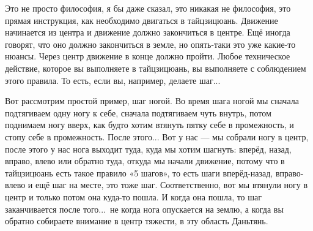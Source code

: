Это не просто философия, я бы даже сказал, это никакая не философия, это прямая инструкция, как
необходимо двигаться в тайцзицюань. Движение начинается из центра и движение должно закончиться
в центре. Ещё иногда говорят, что оно должно закончиться в земле, но опять-таки это уже
какие-то нюансы. Через центр движение в конце должно пройти. Любое техническое действие,
которое вы выполняете в тайцзицюань, вы выполняете с соблюдением этого правила. То есть, если
вы, например, делаете шаг...

Вот рассмотрим простой пример, шаг ногой. Во время шага ногой мы
сначала подтягиваем одну ногу к себе, сначала подтягиваем чуть внутрь, потом поднимаем ногу вверх,
как будто хотим втянуть пятку себе
в промежность, и стопу себе в промежность. После этого... Вот у нас --- мы собрали ногу в центр,
после
этого у нас нога выходит туда, куда мы хотим шагнуть: вперёд, назад, вправо, влево или обратно
туда, откуда мы начали движение, потому что в тайцзицюань есть такое правило «5 шагов», то есть
шаги вперёд-назад, вправо-влево и ещё шаг на месте, это тоже шаг. Соответственно, вот мы
втянули ногу в центр и только потом она куда-то пошла. И когда она пошла, то шаг заканчивается
после того...\ не когда нога опускается на землю, а когда вы обратно собираете внимание в центр
тяжести, в эту область Даньтянь.

